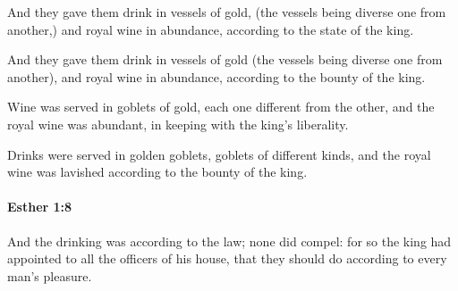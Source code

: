 			And they gave them drink in vessels of gold, (the vessels being diverse one from another,) and royal wine in abundance, according to the state of the king.

			\begin{versebox}
					\item[BHS] 
					\item[LXX] 
					\item[ASV] And they gave them drink in vessels of gold (the vessels being diverse one from another), and royal wine in abundance, according to the bounty of the king.
					\item[NIV] Wine was served in goblets of gold, each one different from the other, and the royal wine was abundant, in keeping with the king’s liberality.
					\item[NRSV] Drinks were served in golden goblets, goblets of different kinds, and the royal wine was lavished according to the bounty of the king.
			\end{versebox}

		\paragraph{Esther 1:8} %
			\label{ESTHER-1-8}

			And the drinking was according to the law; none did compel: for so the king had appointed to all the officers of his house, that they should do according to every man’s pleasure.

